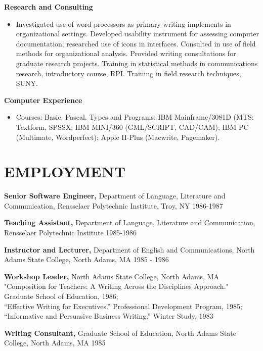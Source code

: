 \documentclass{res}
\begin{document}
\begin{resume}
   {\bf  Research and Consulting} 
        \begin{itemize}
        \item[]  Investigated use of word processors as primary writing 
        implements in organizational settings. Developed 
        usability instrument for assessing computer 
        documentation; researched use of icons in interfaces. 
        Consulted in use of field methods for organizational 
        analysis. Provided writing consultations for graduate 
        research projects. Training in statistical methods in 
        communications research, introductory course, RPI. 
        Training in field research techniques, SUNY. 
       \end{itemize} 

   {\bf Computer Experience} 
        \begin{itemize}
        \item[] Courses: Basic, Pascal. Types and Programs: IBM 
        Mainframe/3081D (MTS: Textform, SPSSX; IBM MINI/360 
        (GML/SCRIPT, CAD/CAM); IBM PC (Multimate, Wordperfect); 
        Apple II-Plus (Macwrite, Pagemaker). 
        \end{itemize}
 
\section{EMPLOYMENT} 
\vspace{0.1in}
    {\bf Senior Software Engineer,} Department of Language, Literature and 
    Communication, Rensselaer Polytechnic Institute, Troy, NY 
    1986-1987 
 
    {\bf Teaching Assistant,} Department of Language, Literature and 
    Communication, Rensselaer Polytechnic Institute  1985-1986 
 
    {\bf Instructor and Lecturer,} Department of English and 
    Communications, North Adams State College, North Adams, MA 
    1985 - 1986 
 
    {\bf Workshop Leader,} North Adams State College, North Adams, MA \\
    "Composition for Teachers: A Writing Across the Disciplines 
    Approach." Graduate School of Education, 1986; \\
    ``Effective Writing for Executives.'' Professional Development 
    Program, 1985; ``Informative and Persuasive Business Writing.''
    Winter Study, 1983 
 
    {\bf Writing Consultant,} Graduate School of Education, North Adams 
    State College, North Adams, MA  1985 
 

\end{resume}
\end{document}
